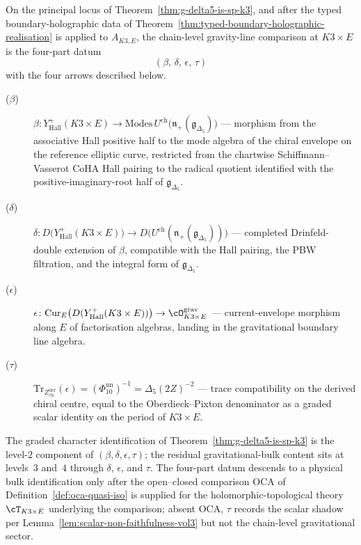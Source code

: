 \begin{conjecture}
\label{conj:hall-borcherds-four-part-datum}
\ClaimStatusConjectured
On the principal locus of Theorem~\ref{thm:g-delta5-is-sp-k3}, and after the typed boundary-holographic data of Theorem~\ref{thm:typed-boundary-holographic-realisation} is applied to $A_{K3, E}$, the chain-level gravity-line comparison at $K3 \times E$ is the four-part datum
\[
(\beta,\, \delta,\, \epsilon,\, \tau)
\]
with the four arrows described below.

\begin{description}
 \item[\textup{($\beta$)}] $\beta\colon Y^+_{\mathrm{Hall}}(K3 \times E) \to \mathrm{Modes}\,U^{\mathrm{ch}}\bigl(\mathfrak{n}_+(\mathfrak{g}_{\Delta_5})\bigr)$ --- morphism from the associative Hall positive half to the mode algebra of the chiral envelope on the reference elliptic curve, restricted from the chartwise Schiffmann--Vasserot CoHA Hall pairing to the radical quotient identified with the positive-imaginary-root half of $\mathfrak{g}_{\Delta_5}$.
 \item[\textup{($\delta$)}] $\delta\colon D\bigl(Y^+_{\mathrm{Hall}}(K3 \times E)\bigr) \to D\bigl(U^{\mathrm{ch}}(\mathfrak{n}_+(\mathfrak{g}_{\Delta_5}))\bigr)$ --- completed Drinfeld-double extension of $\beta$, compatible with the Hall pairing, the PBW filtration, and the integral form of $\mathfrak{g}_{\Delta_5}$.
 \item[\textup{($\epsilon$)}] $\epsilon\colon \mathrm{Cur}_E\bigl(D(Y^+_{\mathrm{Hall}}(K3 \times E))\bigr) \to \cO^{\mathrm{grav}}_{K3 \times E}$ --- current-envelope morphism along $E$ of factorisation algebras, landing in the gravitational boundary line algebra.
 \item[\textup{($\tau$)}] $\mathrm{Tr}_{Z^{\mathrm{der}}_{\mathrm{ch}}}(\epsilon) = (\Phi_{10}^{\mathrm{un}})^{-1} = \Delta_5(2Z)^{-2}$ --- trace compatibility on the derived chiral centre, equal to the Oberdieck--Pixton denominator as a graded scalar identity on the period of $K3 \times E$.
\end{description}

The graded character identification of Theorem~\ref{thm:g-delta5-is-sp-k3} is the level-$2$ component of $(\beta, \delta, \epsilon, \tau)$; the residual gravitational-bulk content sits at levels~$3$ and~$4$ through $\delta$, $\epsilon$, and $\tau$. The four-part datum descends to a physical bulk identification only after the open--closed comparison $\mathrm{OCA}$ of Definition~\ref{def:oca-quasi-iso} is supplied for the holomorphic-topological theory $\cT_{K3 \times E}$ underlying the comparison; absent $\mathrm{OCA}$, $\tau$ records the scalar shadow per Lemma~\ref{lem:scalar-non-faithfulness-vol3} but not the chain-level gravitational sector.
\end{conjecture}

